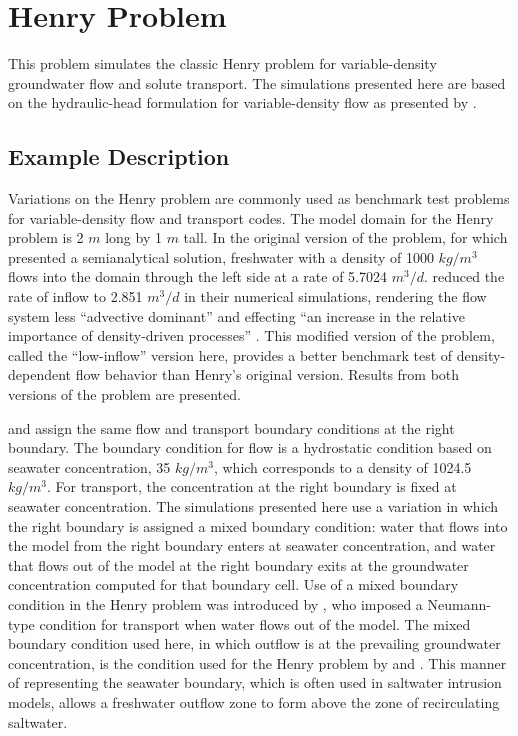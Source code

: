 \section{Henry Problem}

This problem simulates the classic Henry problem \citep{henry1964}  for variable-density groundwater flow and solute transport.  The \mf simulations presented here are based on the hydraulic-head formulation for variable-density flow as presented by \cite{langevin2020hydraulic}.  

\subsection{Example Description}

Variations on the Henry problem \citep{henry1964} are commonly used as benchmark test problems for variable-density flow and transport codes.  The model domain for the Henry problem is 2 $m$ long by 1 $m$ tall. In the original version of the problem, for which \cite{henry1964} presented a semianalytical solution, freshwater with a density of 1000 $kg/m^3$ flows into the domain through the left side at a rate of 5.7024 $m^3/d$. \cite{Simpson2004} reduced the rate of inflow to 2.851 $m^3/d$ in their numerical simulations, rendering the flow system less ``advective dominant'' and effecting ``an increase in the relative importance of density-driven processes'' \citep{Simpson2004}. This modified version of the problem, called the ``low-inflow'' version here, provides a better benchmark test of density-dependent flow behavior than Henry's original version. Results from both versions of the problem are presented.

\cite{henry1964} and \cite{Simpson2004} assign the same flow and transport boundary conditions at the right boundary. The boundary condition for flow is a hydrostatic condition based on seawater concentration, 35 $kg/m^3$, which corresponds to a density of 1024.5 $kg/m^3$. For transport, the concentration at the right boundary is fixed at seawater concentration. The simulations presented here use a variation in which the right boundary is assigned a mixed boundary condition: water that flows into the model from the right boundary enters at seawater concentration, and water that flows out of the model at the right boundary exits at the groundwater concentration computed for that boundary cell. Use of a mixed boundary condition in the Henry problem was introduced by \cite{Segol1975}, who imposed a Neumann-type condition for transport when water flows out of the model. The mixed boundary condition used here, in which outflow is at the prevailing groundwater concentration, is the condition used for the Henry problem by \cite{Voss1984sutra} and \cite{VossSouza1987}. This manner of representing the seawater boundary, which is often used in saltwater intrusion models, allows a freshwater outflow zone to form above the zone of recirculating saltwater. 

